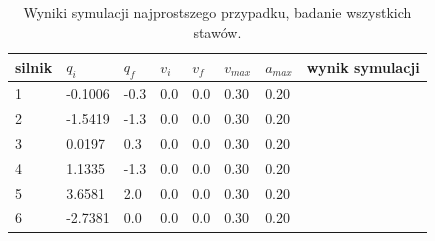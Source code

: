\documentclass[a4paper, 12pt]{article}
\begin{document}
	
	\begin{table}[H]
	\centering
	\begin{tabular}{|m{2.5em}|m{4em}|m{4em}|m{4em}|m{4em}|m{4em}|m{4em}|m{5em}|}
	\hline
	silnik&$ q_i $ & $ q_f $ & $ v_i $ & $ v_f $ & $ v_{max} $ & $ a_{max} $&wynik symulacji\\
	\hline
	\hline
	\hspace{1em}1& -0.1006 & -0.3 & 0.0 & 0.0 & 0.30 & 0.20&\hspace{2em}\checkmark\\ %
	\hline
	\hspace{1em}2& -1.5419 & -1.3 & 0.0 & 0.0 & 0.30 & 0.20&\hspace{2em}\checkmark\\  %
	\hline
	\hspace{1em}3& 0.0197 & 0.3 & 0.0 & 0.0 & 0.30 & 0.20&\hspace{2em}\checkmark\\ %
	\hline
	\hspace{1em}4& 1.1335 & -1.3 & 0.0 & 0.0 & 0.30 & 0.20&\hspace{2em}\checkmark\\  %
	\hline
	\hspace{1em}5& 3.6581 & 2.0 & 0.0 & 0.0 & 0.30 & 0.20&\hspace{2em}\checkmark\\  %
	\hline
	\hspace{1em}6& -2.7381 & 0.0 & 0.0 & 0.0 & 0.30 & 0.20&\hspace{2em}\checkmark\\  %
	\hline
	\end{tabular}
	\caption{Wyniki symulacji najprostszego przypadku, badanie wszystkich stawów.}
	\label{tab:simpJPVall}
	\end{table}
	
\end{document}
